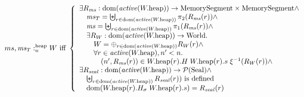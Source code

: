 \documentclass[a4paper]{article}
\begin{document}
\[
  \memSatHeap{ms,\ms_T}{W} \text{ iff } 
  \left\{
    \begin{array}{l}
      \exists R_\ms : \dom(\activeReg{\pwheap}) \fun \MemSeg \times \MemSeg \wedge \\
      \quad \ms_T = \biguplus_{r \in \dom(\activeReg{\pwheap})} \pi_2(R_\ms(r)) \wedge \\
      \quad \ms = \biguplus_{r \in \dom(\activeReg{\pwheap})} \pi_1(R_\ms(r)) \wedge \\
      \quad \exists R_W : \dom(\activeReg{\pwheap}) \fun \World\ldotp\\
      \qquad W = \oplus_{r \in \dom(\activeReg{\pwheap})} R_W(r) \wedge\\
      \qquad \forall r \in \activeReg{\pwheap}, n' < n \ldotp \\
      \qquad \quad \npair[n']{R_\ms(r)} \in  \pwheap(r).H \; \pwheap(r).s \; \xi^{-1}(R_W(r)) \wedge\\
      \exists R_\var{seal} : \dom(\activeReg{\pwheap}) \fun \powerset{\Seal} \wedge\\
      \quad \biguplus_{r \in \dom(\activeReg{\pwheap})} R_\var{seal}(r)) \text{ is defined }\\
      \quad \dom(\pwheap(r).H_\sigma \; \pwheap(r).s) = R_\var{seal}(r)
    \end{array}
  \right.
\]
\end{document}
